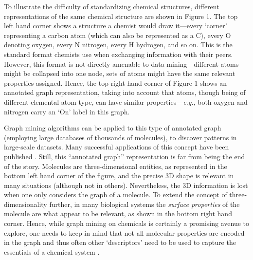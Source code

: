 \documentclass{sig-alternate}
\begin{document}
To illustrate the difficulty of standardizing chemical structures, different
representations of the same chemical structure are shown in Figure 1. The top
left hand corner shows a structure a chemist would draw it---every `corner'
representing a carbon atom (which can also be represented as a C), every O
denoting oxygen, every N nitrogen, every H hydrogen, and so on. This is the
standard format chemists use when exchanging information with their peers.
However, this format is not directly amenable to data mining---different atoms might
be collapsed into one node, sets of atoms might have the same relevant
properties assigned. Hence, the top right hand corner of Figure 1 shows an
annotated graph representation, taking into account that atoms, though being of
different elemental atom type, can have similar properties---\emph{e.g.}, both oxygen
and nitrogen carry an `On' label in this graph.


Graph mining algorithms can be applied to this type of annotated graph
(employing large databases of thousands of molecules), to discover
patterns in large-scale datasets.  Many successful applications of
this concept have been published \cite{wegner2006,horst2009}. Still,
this ``annotated graph'' representation is far from being the end of
the story. Molecules are three-dimensional entities, as represented in
the bottom left hand corner of the figure, and the precise 3D shape is
relevant in many situations (although not in others).  Nevertheless,
the 3D information is lost when one only considers the graph of a
molecule. To extend the concept of three-dimensionality further, in
many biological systems the \emph{surface properties} of the molecule
are what appear to be relevant, as shown in the bottom right hand
corner.  Hence, while graph mining on chemicals is certainly a
promising avenue to explore, one needs to keep in mind that not all
molecular properties are encoded in the graph and thus often other
`descriptors' need to be used to capture the essentials of a chemical
system \cite{bender2004}.
\end{document}
